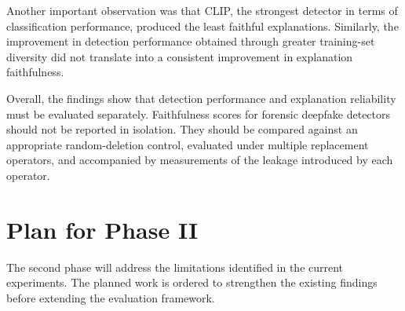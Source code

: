 Another important observation was that CLIP, the strongest detector
in terms of classification performance, produced the least faithful
explanations. Similarly, the improvement in detection performance
obtained through greater training-set diversity did not translate
into a consistent improvement in explanation faithfulness.

Overall, the findings show that detection performance and explanation
reliability must be evaluated separately. Faithfulness scores for
forensic deepfake detectors should not be reported in isolation.
They should be compared against an appropriate random-deletion
control, evaluated under multiple replacement operators, and
accompanied by measurements of the leakage introduced by each
operator.

\section{Plan for Phase II}

The second phase will address the limitations identified in the
current experiments. The planned work is ordered to strengthen the
existing findings before extending the evaluation framework.

